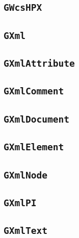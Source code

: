 \documentclass{article}[12pt,a4]
\begin{document}
\subsection{{\tt GWcsHPX}}

\subsection{{\tt GXml}}

\subsection{{\tt GXmlAttribute}}

\subsection{{\tt GXmlComment}}

\subsection{{\tt GXmlDocument}}

\subsection{{\tt GXmlElement}}

\subsection{{\tt GXmlNode}}

\subsection{{\tt GXmlPI}}

\subsection{{\tt GXmlText}}
\end{document}

